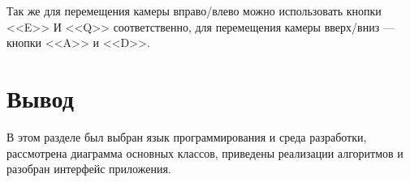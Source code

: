 Так же для перемещения камеры вправо/влево можно использовать кнопки <<E>> И <<Q>> соответственно, для перемещения камеры вверх/вниз --- кнопки <<A>> и <<D>>.


\section{Вывод}
В этом разделе был выбран язык программирования и среда разработки, рассмотрена диаграмма основных классов, приведены реализации алгоритмов и разобран интерфейс приложения.